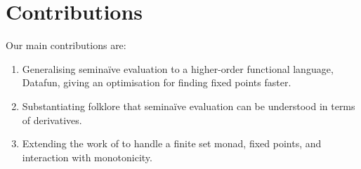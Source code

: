\documentclass[sigplan,screen,dvipsnames]{acmart}
\newcommand{\naive}{na\"ive}
\begin{document}

\section{Contributions}

Our main contributions are:%

\begin{enumerate}\setlength\itemsep{1ex}
\item Generalising semi\naive{} evaluation to a higher-order functional
  language, Datafun, giving an optimisation for finding fixed points faster.

\item Substantiating folklore that semi\naive{} evaluation can be understood in
  terms of derivatives.

\item Extending the work of \citet{incremental} to handle a finite set monad,
  fixed points, and interaction with monotonicity.
\end{enumerate}




\end{document}

